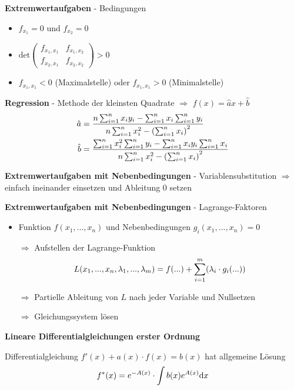 \documentclass[10pt,landscape,a4paper]{article}
\begin{document}
\begin{multicols*}{4}
\textbf{Extremwertaufgaben} - Bedingungen
\begin{itemize}
	\item $f_{x_1}=0$ und $f_{x_2}=0$
	\item $\text{det}\begin{pmatrix}
		f_{x_1,x_1} & f_{x_1,x_2} \\ f_{x_2,x_1} & f_{x_2,x_2}
	\end{pmatrix}>0$
	\item $f_{x_1,x_1}<0$ (Maximalstelle) oder $f_{x_1,x_1}>0$ (Minimalstelle)
\end{itemize}

\textbf{Regression} - Methode der kleinsten Quadrate $\Rightarrow$ $f(x)=\hat{a}x+\hat{b}$
\begin{align}
	\hat{a} &= \frac{n \sum_{i=1}^{n} x_{i} y_{i}-\sum_{i=1}^{n} x_{i} \sum_{i=1}^{n} y_{i}}{n \sum_{i=1}^{n} x_{i}^{2}-\left(\sum_{i=1}^{n} x_{i}\right)^{2}} \notag \\
	\hat{b} &= \frac{\sum_{i=1}^{n} x_{i}^{2} \sum_{i=1}^{n} y_{i}-\sum_{i=1}^{n} x_{i} y_{i} \sum_{i=1}^{n} x_{i}}{n \sum_{i=1}^{n} x_{i}^{2}-\left(\sum_{i=1}^{n} x_{i}\right)^{2}} \notag
\end{align}

\textbf{Extremwertaufgaben mit Nebenbedingungen} - Variablensubstitution $\Rightarrow$ einfach ineinander einsetzen und Ableitung 0 setzen

\textbf{Extremwertaufgaben mit Nebenbedingungen} - Lagrange-Faktoren
\begin{itemize}
	\item Funktion $f(x_1,...,x_n)$ und Nebenbedingungen $g_i(x_1,...,x_n)=0$
	\item[$\Rightarrow$] Aufstellen der Lagrange-Funktion
	\begin{align}
		L(x_1,...,x_n,\lambda_1,...,\lambda_m) = f(...) + \sum_{i=1}^m (\lambda_i\cdot g_i(...)) \notag
	\end{align}
	\item[$\Rightarrow$] Partielle Ableitung von $L$ nach jeder Variable und Nullsetzen
	\item[$\Rightarrow$] Gleichungssystem lösen
\end{itemize}

\begin{center}
	\normalsize{\textbf{Lineare Differentialgleichungen erster Ordnung}}
\end{center}
Differentialgleichung $f'(x) + a(x)\cdot f(x)=b(x)$ hat allgemeine Lösung
\begin{align}
	f^\ast(x) = e^{-A(x)}\cdot\int b(x)e^{A(x)}\mathrm{d}x \notag
\end{align}

\end{multicols*}
\end{document}
